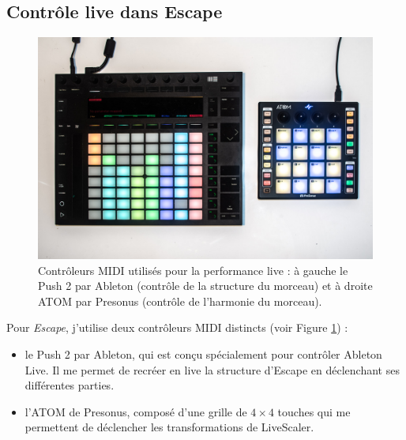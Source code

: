 \subsection{Contrôle live dans Escape}
\begin{figure}[htbp]
  \centering
  \includegraphics[width=\columnwidth]{Figures/IMGP9899.jpg}
  \caption{Contrôleurs MIDI utilisés pour la performance live : à gauche le Push 2 par Ableton (contrôle de la structure du morceau) et à droite ATOM par Presonus (contrôle de l'harmonie du morceau).\label{fig:controleurs}}
\end{figure}
Pour \emph{Escape}, j'utilise deux contrôleurs MIDI distincts (voir Figure \ref{fig:controleurs}) :
\begin{itemize}
  \item le Push 2 par Ableton, qui est conçu spécialement pour contrôler Ableton Live. Il me permet de recréer en live la structure d'Escape en déclenchant ses différentes parties.
  \item l'ATOM de Presonus, composé d'une grille de $4\times 4$ touches qui me permettent de déclencher les transformations de LiveScaler.
\end{itemize}






